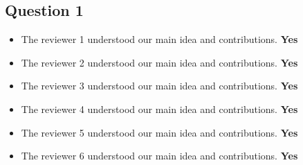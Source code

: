 \documentclass[rebuttal]{cvpr}
\begin{document}
\subsection{Question 1}
\begin{itemize}
    \item The reviewer 1 understood our main idea and contributions. \textbf{Yes}
    
    \item The reviewer 2 understood our main idea and contributions. \textbf{Yes}
    
    \item The reviewer 3 understood our main idea and contributions. \textbf{Yes}
    
    \item The reviewer 4 understood our main idea and contributions. \textbf{Yes}
    \item The reviewer 5 understood our main idea and contributions. \textbf{Yes}
    
    \item The reviewer 6 understood our main idea and contributions. \textbf{Yes}
\end{itemize}
\end{document}
